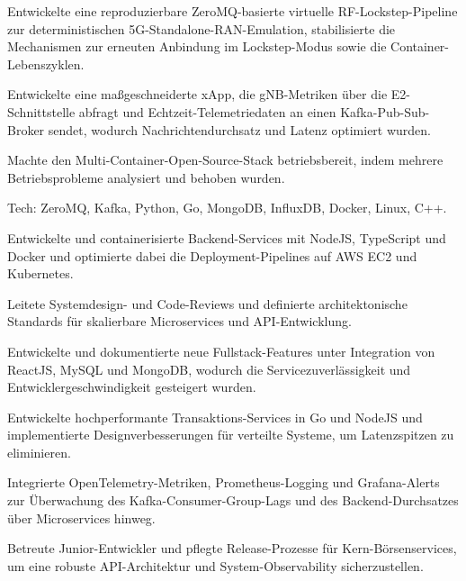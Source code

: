 \documentclass[10pt,a4paper]{resume}
\begin{document}
\bullets
  \item Entwickelte eine reproduzierbare ZeroMQ-basierte virtuelle RF-Lockstep-Pipeline zur deterministischen 5G-Standalone-RAN-Emulation, stabilisierte die Mechanismen zur erneuten Anbindung im Lockstep-Modus sowie die Container-Lebenszyklen.
  \item Entwickelte eine maßgeschneiderte xApp, die gNB-Metriken über die E2-Schnittstelle abfragt und Echtzeit-Telemetriedaten an einen Kafka-Pub-Sub-Broker sendet, wodurch Nachrichtendurchsatz und Latenz optimiert wurden.
  \item Machte den Multi-Container-Open-Source-Stack betriebsbereit, indem mehrere Betriebsprobleme analysiert und behoben wurden.
  \item Tech: ZeroMQ, Kafka, Python, Go, MongoDB, InfluxDB, Docker, Linux, C++.
\bulletsend
\vspace{1.5pt}
\bullets
  \item Entwickelte und containerisierte Backend-Services mit NodeJS, TypeScript und Docker und optimierte dabei die Deployment-Pipelines auf AWS EC2 und Kubernetes.
  \item Leitete Systemdesign- und Code-Reviews und definierte architektonische Standards für skalierbare Microservices und API-Entwicklung.
  \item Entwickelte und dokumentierte neue Fullstack-Features unter Integration von ReactJS, MySQL und MongoDB, wodurch die Servicezuverlässigkeit und Entwicklergeschwindigkeit gesteigert wurden.
\bulletsend
\vspace{1.5pt}
\bullets
  \item Entwickelte hochperformante Transaktions-Services in Go und NodeJS und implementierte Designverbesserungen für verteilte Systeme, um Latenzspitzen zu eliminieren.
  \item Integrierte OpenTelemetry-Metriken, Prometheus-Logging und Grafana-Alerts zur Überwachung des Kafka-Consumer-Group-Lags und des Backend-Durchsatzes über Microservices hinweg.
  \item Betreute Junior-Entwickler und pflegte Release-Prozesse für Kern-Börsenservices, um eine robuste API-Architektur und System-Observability sicherzustellen.
\bulletsend
\vspace{1.5pt}
\end{document}
